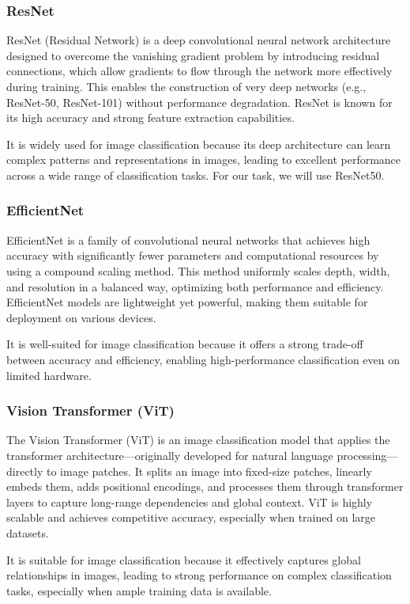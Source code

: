 \documentclass[11pt,a4paper,onecolumn]{article}
\begin{document}
\subsubsection{ResNet}
ResNet (Residual Network) is a deep convolutional neural network architecture designed to overcome the vanishing
gradient problem by introducing residual connections, which allow gradients to flow through the network more
effectively during training. This enables the construction of very deep networks (e.g., ResNet-50, ResNet-101)
without performance degradation. ResNet is known for its high accuracy and strong feature extraction capabilities.

It is widely used for image classification because its deep architecture can learn complex patterns and
representations in images, leading to excellent performance across a wide range of classification tasks. For our
task, we will use ResNet50.

\subsubsection{EfficientNet}
EfficientNet is a family of convolutional neural networks that achieves high accuracy with significantly fewer
parameters and computational resources by using a compound scaling method. This method uniformly scales depth,
width, and resolution in a balanced way, optimizing both performance and efficiency. EfficientNet models are
lightweight yet powerful, making them suitable for deployment on various devices.

It is well-suited for image classification because it offers a strong trade-off between accuracy and efficiency,
enabling high-performance classification even on limited hardware.

\subsubsection{Vision Transformer (ViT)}
The Vision Transformer (ViT) is an image classification model that applies the transformer architecture—originally
developed for natural language processing—directly to image patches. It splits an image into fixed-size patches,
linearly embeds them, adds positional encodings, and processes them through transformer layers to capture long-range
dependencies and global context. ViT is highly scalable and achieves competitive accuracy, especially when trained
on large datasets.

It is suitable for image classification because it effectively captures global relationships in images, leading to
strong performance on complex classification tasks, especially when ample training data is available.
\end{document}
